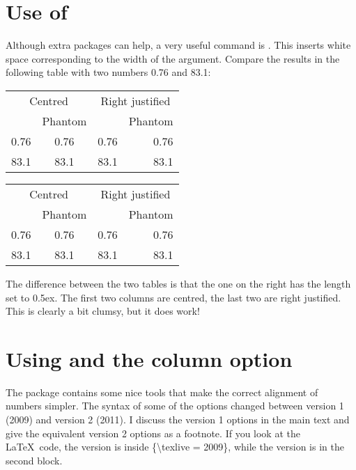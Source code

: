 \section{Use of }
\label{sec:table:phantom}

Although extra packages can help, a very useful command is
. This inserts white space corresponding to the width
of the argument. Compare the results in the following table with two
numbers 0.76 and 83.1:

\begin{tabular}{cc|rr}
  \multicolumn{2}{c|}{Centred} &
  \multicolumn{2}{c}{Right justified} \\
  & Phantom & & Phantom\\\hline
  0.76 & \phantom{0}0.76 & 0.76 & 0.76\\
  83.1 & 83.1\phantom{0} & 83.1 & 83.1\phantom{0}
\end{tabular}
\qquad
{\setlength{\extrarowheight}{0.5ex}
\begin{tabular}{cc|rr}
  \multicolumn{2}{c|}{Centred} &
  \multicolumn{2}{c}{Right justified} \\
  & Phantom & & Phantom\\\hline
  0.76 & \phantom{0}0.76 & 0.76 & 0.76\\
  83.1 & 83.1\phantom{0} & 83.1 & 83.1\phantom{0}
\end{tabular}
}
\par\noindent
The difference between the two tables is that the one on the right
has the length  set to 0.5ex.  The first two
columns are centred, the last two are right justified.  This is
clearly a bit clumsy, but it does work!


\section{Using  and the  column option}
\label{sec:table:siunitx}

The  package contains some nice tools that make the
correct alignment of numbers simpler. The syntax of some of the
options changed between version 1 (2009) and version 2 (2011). I
discuss the version 1 options in the main text and give the
equivalent version 2 options as a footnote. If you look at the \LaTeX\
code, the  version is inside \{\textbackslash texlive = 2009\}, while the  version
is in the second block.

